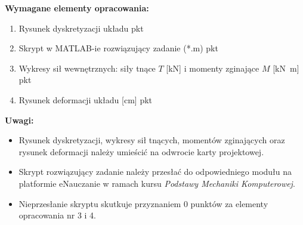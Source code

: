 \documentclass[a4paper,10pt]{article}
\begin{document}
    \vspace{5mm}

    \noindent\textbf{Wymagane elementy opracowania:}

    \begin{enumerate}
    \item Rysunek dyskretyzacji układu  pkt
    \item Skrypt w MATLAB-ie rozwiązujący zadanie (*.m)  pkt
    \item Wykresy sił wewnętrznych: siły tnące \(T\) [\si{\kilo\newton}] i momenty zginające \(M\) [\si{\kilo\newton m}]  pkt
    \item Rysunek deformacji układu [\si{\centi\meter}]  pkt
    \end{enumerate}

    \vspace{5mm}

    \noindent\textbf{Uwagi:}
    \begin{itemize}
    \item Rysunek dyskretyzacji, wykresy sił tnących, momentów zginających oraz rysunek deformacji należy umieścić na odwrocie karty projektowej.
    \item Skrypt rozwiązujący zadanie należy przesłać do odpowiedniego modułu na platformie eNauczanie w ramach kursu \textit{Podstawy Mechaniki Komputerowej}.
    \item Nieprzesłanie skryptu skutkuje przyznaniem 0 punktów za elementy opracowania nr 3 i 4.
    \end{itemize}
\end{document}
